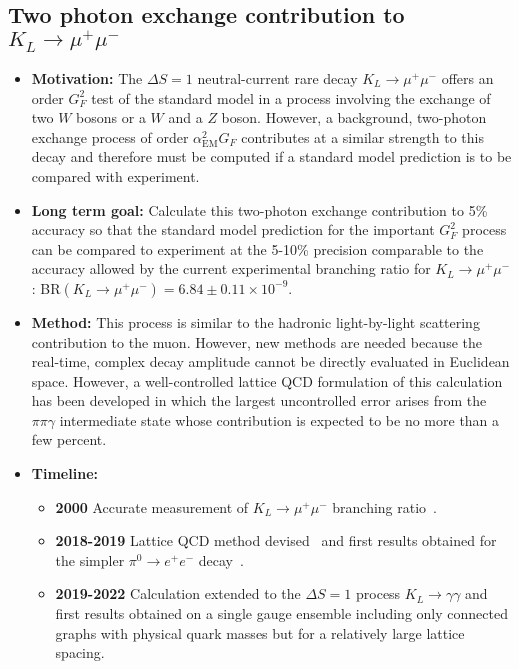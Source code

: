 \documentclass[12pt,hyperpdf]{article}
\begin{document}
\subsection{Two photon exchange contribution to $K_L\to\mu^+\mu^-$}
\begin{itemize}
    \item{\bf Motivation:} The $\Delta S=1$ neutral-current rare decay $K_L\to\mu^+\mu^-$ 
    offers an order $G_F^2$ test of the standard model in a process involving the 
    exchange of two $W$ bosons or a $W$ and a $Z$ boson.  However, a background, 
    two-photon exchange process of order $\alpha_{\mathrm{EM}}^2G_F$ contributes 
    at a similar strength to this decay and therefore must be computed if a standard 
    model prediction is to be compared with experiment.
    \item{\bf Long term goal:} Calculate this two-photon exchange contribution to 5\% 
    accuracy so that the standard model prediction for the important $G_F^2$ process 
    can be compared to experiment at the 5-10\% precision comparable to the accuracy 
    allowed by the current experimental branching ratio for $K_L\to\mu^+\mu^-$: 
    BR$(K_L\to\mu^+\mu^-) = 6.84\pm0.11\times 10^{-9}$.
    \item{\bf Method:}  This process is similar to the hadronic light-by-light scattering 
    contribution to the muon.  However, new methods are needed because the 
    real-time, complex decay amplitude cannot be directly evaluated in Euclidean 
    space.  However, a well-controlled lattice QCD formulation of this calculation 
    has been developed in which the largest uncontrolled error arises from the 
    $\pi\pi\gamma$ intermediate state whose contribution is expected to be no 
    more than a few percent.
\item{\bf Timeline:}
\begin{itemize}
    \item{\bf 2000} Accurate measurement of $K_L\to\mu^+\mu^-$ branching 
    ratio~\cite{E871:2000wvm}.
    \item{\bf 2018-2019} Lattice QCD method devised~\cite{Christ:2020bzb} and 
    first results obtained for the simpler $\pi^0\to e^+ e^-$ 
    decay~\cite{Christ:2020dae, Christ:2022rho}.
    \item{\bf 2019-2022} Calculation extended to the $\Delta S=1$ process 
    $K_L\to\gamma\gamma$ and first results obtained on a single gauge 
    ensemble including only connected graphs with physical quark masses 
    but for a relatively large lattice spacing.~\cite{Zhao:2022pbs, Zhao:2022njd}

\end{itemize}
\end{itemize}
\end{document}
